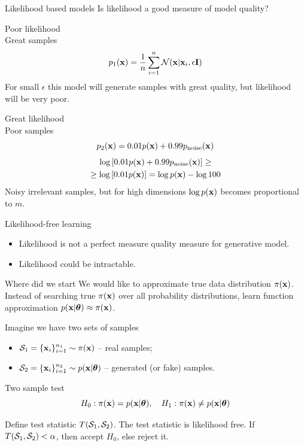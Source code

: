 \begin{frame}{Likelihood based models}
	Is likelihood a good measure of model quality?
	\begin{minipage}[t]{0.48\columnwidth}
		\begin{block}{Poor likelihood \\ Great samples}
			\vspace{-0.3cm}
			\[
				p_1(\mathbf{x}) = \frac{1}{n} \sum_{i=1}^n \mathcal{N}(\mathbf{x} | \mathbf{x}_i, \epsilon \mathbf{I})
			\]
			For small $\epsilon$ this model will generate samples with great quality, but likelihood will be very poor.
		\end{block}
	\end{minipage}%
	\begin{minipage}[t]{0.52\columnwidth}
		\begin{block}{Great likelihood \\ Poor samples}
			\vspace{-0.3cm}
			\[
				p_2(\mathbf{x}) = 0.01p(\mathbf{x}) + 0.99p_{\text{noise}}(\mathbf{x})
			\]
			\begin{multline*}
				\log \left[ 0.01p(\mathbf{x}) + 0.99p_{\text{noise}}(\mathbf{x}) \right] \geq  \\ \geq \log \left[ 0.01p(\mathbf{x}) \right]  = \log p(\mathbf{x}) - \log 100
			\end{multline*}
		Noisy irrelevant samples, but for high dimensions $\log p(\mathbf{x})$ becomes proportional to $m$.
		\end{block}
	\end{minipage}
\end{frame}
\begin{frame}{Likelihood-free learning}
	\begin{itemize}
		\item Likelihood is not a perfect measure quality measure for generative model.
		\item Likelihood could be intractable.
	\end{itemize}
	\begin{block}{Where did we start}
	 We would like to approximate true data distribution $\pi(\mathbf{x})$.
		Instead of searching true $\pi(\mathbf{x})$ over all probability distributions, learn function approximation $p(\mathbf{x} | \boldsymbol{\theta}) \approx \pi(\mathbf{x})$.
	\end{block}
	Imagine we have two sets of samples 
	\begin{itemize}
		\item $\mathcal{S}_1 = \{\mathbf{x}_i\}_{i=1}^{n_1} \sim \pi(\mathbf{x})$ -- real samples;
		\item $\mathcal{S}_2 = \{\mathbf{x}_i\}_{i=1}^{n_2} \sim p(\mathbf{x} | \boldsymbol{\theta})$ -- generated (or fake) samples.
	\end{itemize}
	\begin{block}{Two sample test}
		\vspace{-0.3cm}
		\[
			H_0: \pi(\mathbf{x}) = p(\mathbf{x} | \boldsymbol{\theta}), \quad H_1: \pi(\mathbf{x}) \neq p(\mathbf{x} | \boldsymbol{\theta})
		\]
	\end{block}
	Define test statistic $T(\mathcal{S}_1, \mathcal{S}_2)$. The test statistic is likelihood free.
	If $T(\mathcal{S}_1, \mathcal{S}_2) < \alpha$, then accept $H_0$, else reject it.
\end{frame}
